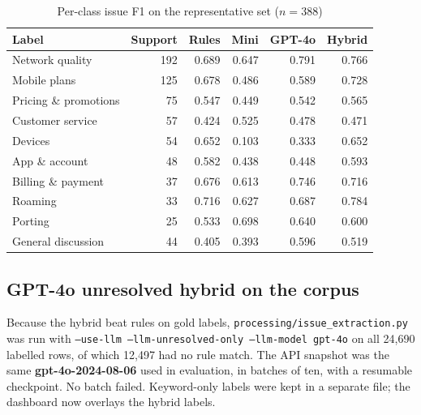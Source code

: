 \documentclass[11pt,a4paper]{article}
\begin{document}
\begin{table}[H]
\centering
\caption{Per-class issue F1 on the representative set ($n=388$)}
\label{tab:issueclass}
\begin{tabular}{lrrrrr}
\toprule
\textbf{Label} & \textbf{Support} & \textbf{Rules} & \textbf{Mini} & \textbf{GPT-4o} & \textbf{Hybrid} \\
\midrule
Network quality & 192 & 0.689 & 0.647 & 0.791 & 0.766 \\
Mobile plans & 125 & 0.678 & 0.486 & 0.589 & 0.728 \\
Pricing \& promotions & 75 & 0.547 & 0.449 & 0.542 & 0.565 \\
Customer service & 57 & 0.424 & 0.525 & 0.478 & 0.471 \\
Devices & 54 & 0.652 & 0.103 & 0.333 & 0.652 \\
App \& account & 48 & 0.582 & 0.438 & 0.448 & 0.593 \\
Billing \& payment & 37 & 0.676 & 0.613 & 0.746 & 0.716 \\
Roaming & 33 & 0.716 & 0.627 & 0.687 & 0.784 \\
Porting & 25 & 0.533 & 0.698 & 0.640 & 0.600 \\
General discussion & 44 & 0.405 & 0.393 & 0.596 & 0.519 \\
\bottomrule
\end{tabular}
\end{table}

\subsection{GPT-4o unresolved hybrid on the corpus}

Because the hybrid beat rules on gold labels, \texttt{processing/issue\_extraction.py} was run with \texttt{--use-llm --llm-unresolved-only --llm-model gpt-4o} on all 24,690 labelled rows, of which 12,497 had no rule match. The API snapshot was the same \textbf{gpt-4o-2024-08-06} used in evaluation, in batches of ten, with a resumable checkpoint. No batch failed. Keyword-only labels were kept in a separate file; the dashboard now overlays the hybrid labels.
\end{document}
